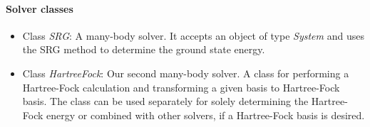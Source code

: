 \paragraph*{Solver classes}
\begin{itemize}
\item Class \textit{SRG}: A many-body solver. It accepts an object of type \textit{System} and uses the SRG method to determine the ground state energy.
\item Class \textit{HartreeFock}: Our second many-body solver. A class for performing a Hartree-Fock calculation and transforming a given basis to  Hartree-Fock basis. The class can be used separately for solely determining the Hartree-Fock energy or combined with other solvers, if a Hartree-Fock basis is desired.
\end{itemize}

